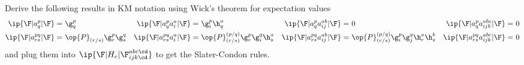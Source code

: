 \documentclass[11pt,fleqn]{article}
\numberwithin{equation}{section}
\begin{document}
\begin{prob}
Derive the following results in KM notation using Wick's theorem for expectation values
\begin{align*}
  \ip{\F|a^p_q|\F}
=&\
  \g^p_q
&
  \ip{\F|a^p_qa^a_i|\F}
=&\
  \g^p_i\h^a_q
&
  \ip{\F|a^p_qa^{ab}_{ij}|\F}
=&\
  0
&
  \ip{\F|a^p_qa^{abc}_{ijk}|\F}
=&\
  0
\\
  \ip{\F|a^{pq}_{rs}|\F}
=&\
  \op{P}_{(r/s)}
  \g^p_r\g^q_s
&
  \ip{\F|a^{pq}_{rs}a^a_i|\F}
=&\
  \op{P}^{(p/q)}_{(r/s)}
  \g^p_r\g^q_i\h^a_s
&
  \ip{\F|a^{pq}_{rs}a^{ab}_{ij}|\F}
=&\
  \op{P}^{(p/q)}_{(r/s)}
  \g^p_i\g^q_j\h^a_r\h^b_s
&
  \ip{\F|a^{pq}_{rs}a^{abc}_{ijk}|\F}
=&\
  0
\end{align*}
and plug them into $\ip{\F|H_e|\F^{abc\cd}_{ijk\cd}}$ to get the Slater-Condon rules.
\end{prob}
\end{document}
